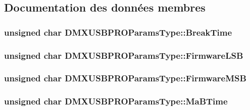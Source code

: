 \subsection{Documentation des données membres}
\hypertarget{struct_d_m_x_u_s_b_p_r_o_params_type_a86773af46c2e39c7b260ce1f09ca0a36}{
\subsubsection[{Break\-Time}]{\setlength{\rightskip}{0pt plus 5cm}unsigned char D\-M\-X\-U\-S\-B\-P\-R\-O\-Params\-Type\-::\-Break\-Time}}\label{struct_d_m_x_u_s_b_p_r_o_params_type_a86773af46c2e39c7b260ce1f09ca0a36}
\hypertarget{struct_d_m_x_u_s_b_p_r_o_params_type_aafb2113e09068d2c2d90d4254e57e580}{
\subsubsection[{Firmware\-L\-S\-B}]{\setlength{\rightskip}{0pt plus 5cm}unsigned char D\-M\-X\-U\-S\-B\-P\-R\-O\-Params\-Type\-::\-Firmware\-L\-S\-B}}\label{struct_d_m_x_u_s_b_p_r_o_params_type_aafb2113e09068d2c2d90d4254e57e580}
\hypertarget{struct_d_m_x_u_s_b_p_r_o_params_type_a545afd72b346f85996c1ae3d0b35a0ef}{
\subsubsection[{Firmware\-M\-S\-B}]{\setlength{\rightskip}{0pt plus 5cm}unsigned char D\-M\-X\-U\-S\-B\-P\-R\-O\-Params\-Type\-::\-Firmware\-M\-S\-B}}\label{struct_d_m_x_u_s_b_p_r_o_params_type_a545afd72b346f85996c1ae3d0b35a0ef}
\hypertarget{struct_d_m_x_u_s_b_p_r_o_params_type_a1ab62801637fe44bba062f2bfa54e38e}{
\subsubsection[{Ma\-B\-Time}]{\setlength{\rightskip}{0pt plus 5cm}unsigned char D\-M\-X\-U\-S\-B\-P\-R\-O\-Params\-Type\-::\-Ma\-B\-Time}}\label{struct_d_m_x_u_s_b_p_r_o_params_type_a1ab62801637fe44bba062f2bfa54e38e}
